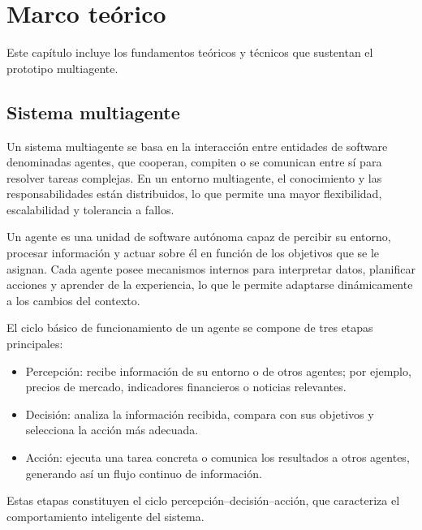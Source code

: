 \chapter{Marco teórico} %

\label{Chapter2}

Este capítulo incluye los fundamentos teóricos y técnicos que sustentan el prototipo multiagente. 


\section{Sistema multiagente}

Un sistema multiagente se basa en la interacción entre entidades de software denominadas agentes, que cooperan, compiten o se comunican entre sí para resolver tareas complejas. En un entorno multiagente, el conocimiento y las responsabilidades están distribuidos, lo que permite una mayor flexibilidad, escalabilidad y tolerancia a fallos.

Un agente es una unidad de software autónoma capaz de percibir su entorno, procesar información y actuar sobre él en función de los objetivos que se le asignan. Cada agente posee mecanismos internos para interpretar datos, planificar acciones y aprender de la experiencia, lo que le permite adaptarse dinámicamente a los cambios del contexto.

El ciclo básico de funcionamiento de un agente se compone de tres etapas principales:

\begin{itemize}[leftmargin=1.5em]
    \item Percepción: recibe información de su entorno o de otros agentes; por ejemplo, precios de mercado, indicadores financieros o noticias relevantes.
    \item Decisión: analiza la información recibida, compara con sus objetivos y selecciona la acción más adecuada.
    \item Acción: ejecuta una tarea concreta o comunica los resultados a otros agentes, generando así un flujo continuo de información.
\end{itemize}

Estas etapas constituyen el ciclo percepción–decisión–acción, que caracteriza el comportamiento inteligente del sistema.

